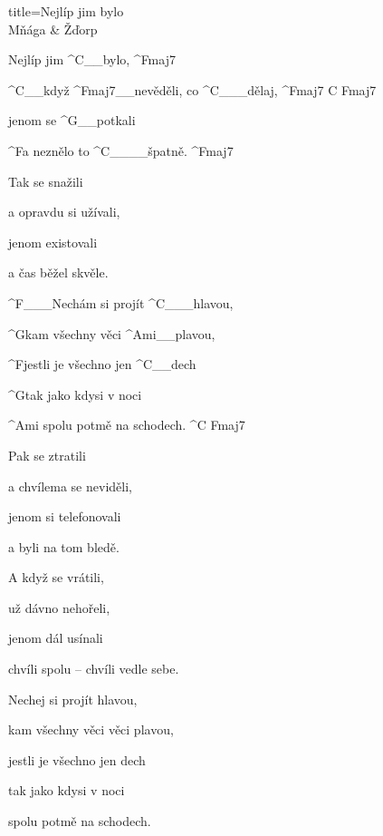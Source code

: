 \begin{song}{title=\predtitle\centering Nejlíp jim bylo \\\large Mňága \& Žďorp  \vspace*{-0.3cm}}  %
\begin{centerjustified}


\sloka
	Nejlíp jim ^{C{\color{white}\_\_}}bylo, ^{Fmaj7}

	^{C{\color{white}\_\_}}když ^{Fmaj7{\color{white}\_\_}}nevěděli, co ^{C{\color{white}\_\_\_}}dělaj, ^{Fmaj7\,\,C\,\,Fmaj7}

	jenom se ^{G{\color{white}\_\_}}potkali

	^{F}a neznělo to ^{C{\color{white}\_\_\_\_}}špatně. ^{Fmaj7}

\sloka
	Tak se snažili

	a opravdu si užívali,

	jenom existovali

	a čas běžel skvěle.

	^{F{\color{white}\_\_\_}}Nechám si projít ^{C{\color{white}\_\_\_}}hlavou,

	^{G}kam všechny věci ^{Ami{\color{white}\_\_}}plavou,

	^{F\z}jestli je všechno jen ^{C{\color{white}\_\_}}dech

	^{G}tak jako kdysi v noci

	^{Ami\,\,}spolu potmě na schodech. ^{C\,\,Fmaj7}

\sloka
	Pak se ztratili

	a chvílema se neviděli,

	jenom si telefonovali

	a byli na tom bledě.

\sloka
	A když se vrátili,

	už dávno nehořeli,

	jenom dál usínali

	chvíli spolu -- chvíli vedle sebe.


	Nechej si projít hlavou,

	kam všechny věci věci plavou,

	jestli je všechno jen dech

	tak jako kdysi v noci

	spolu potmě na schodech.


\end{centerjustified}
\setcounter{Slokočet}{0}
\end{song}
